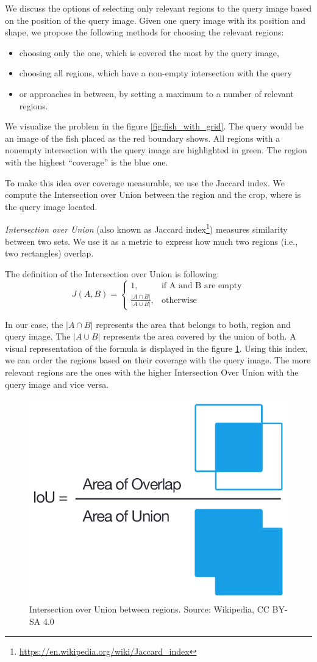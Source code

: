 We discuss the options of selecting only relevant regions to the query image based on the position of the query image. Given one query image with its position and shape, we propose the following methods for choosing the relevant regions:
\begin{itemize}
  \item choosing only the one, which is covered the most by the query image,
  \item choosing all regions, which have a non-empty intersection with the query
  \item or approaches in between, by setting a maximum to a number of relevant regions.
\end{itemize}

We visualize the problem in the figure \ref{fig:fish_with_grid}. The query would be an image of the fish placed as the red boundary shows. All regions with a nonempty intersection with the query image are highlighted in green. The region with the highest ``coverage'' is the blue one.

To make this idea over coverage measurable, we use the Jaccard index. We compute the Intersection over Union between the region and the crop, where is the query image located. 

\emph{Intersection over Union} (also known as Jaccard index\footnote{\href{https://en.wikipedia.org/wiki/Jaccard_index}{https://en.wikipedia.org/wiki/Jaccard\_index}}) measures similarity between two sets. We use it as a metric to express how much two regions (i.e., two rectangles) overlap. 

The definition of the Intersection over Union is following:
$$
    J(A, B) = 
    \begin{cases}
      1, & \text{if\ A and B are empty} \\
      \frac{|A \cap B|}{|A \cup B|}, & \text{otherwise}
    \end{cases}
$$

In our case, the $|A \cap B|$ represents the area that belongs to both, region and query image. The  $|A \cup B|$ represents the area covered by the union of both. A visual representation of the formula is displayed in the figure \ref{fig:intersection_over_union}. Using this index, we can order the regions based on their coverage with the query image. The more relevant regions are the ones with the higher Intersection Over Union with the query image and vice versa.

\begin{figure}
    \centering
	\includegraphics[width=0.3\linewidth]{img/Intersection_over_Union_-_visual_equation.png}
	\caption{Intersection over Union between regions. Source: Wikipedia, CC BY-SA 4.0}
	\label{fig:intersection_over_union}
\end{figure}

